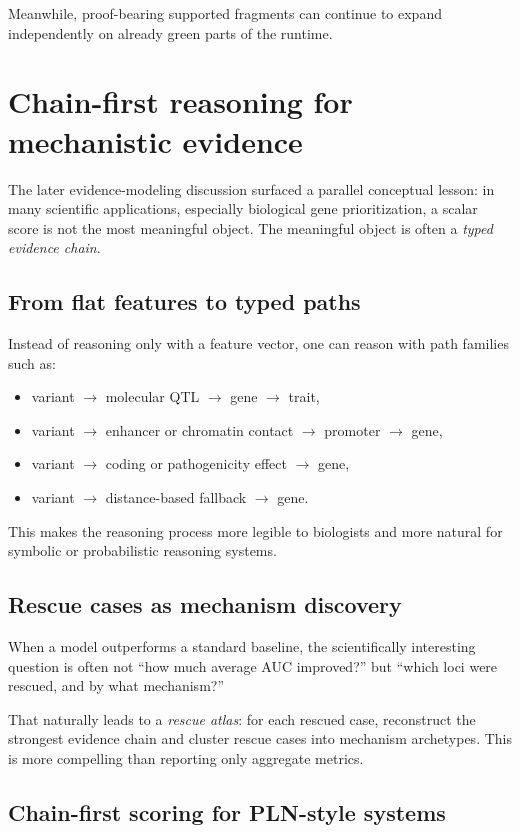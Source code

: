 \documentclass[11pt]{article}
\newcommand{\term}[1]{\emph{#1}}
\begin{document}
Meanwhile, proof-bearing supported fragments can continue to expand independently on already green parts of the runtime.

\section{Chain-first reasoning for mechanistic evidence}

The later evidence-modeling discussion surfaced a parallel conceptual lesson: in many scientific applications, especially biological gene prioritization, a scalar score is not the most meaningful object. The meaningful object is often a \term{typed evidence chain}.

\subsection{From flat features to typed paths}

Instead of reasoning only with a feature vector, one can reason with path families such as:

\begin{itemize}
  \item variant $\to$ molecular QTL $\to$ gene $\to$ trait,
  \item variant $\to$ enhancer or chromatin contact $\to$ promoter $\to$ gene,
  \item variant $\to$ coding or pathogenicity effect $\to$ gene,
  \item variant $\to$ distance-based fallback $\to$ gene.
\end{itemize}

This makes the reasoning process more legible to biologists and more natural for symbolic or probabilistic reasoning systems.

\subsection{Rescue cases as mechanism discovery}

When a model outperforms a standard baseline, the scientifically interesting question is often not ``how much average AUC improved?'' but ``which loci were rescued, and by what mechanism?''

That naturally leads to a \term{rescue atlas}: for each rescued case, reconstruct the strongest evidence chain and cluster rescue cases into mechanism archetypes. This is more compelling than reporting only aggregate metrics.

\subsection{Chain-first scoring for PLN-style systems}
\end{document}
